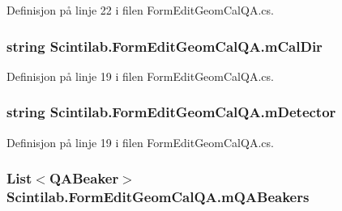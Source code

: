 Definisjon på linje 22 i filen Form\+Edit\+Geom\+Cal\+Q\+A.\+cs.

\hypertarget{class_scintilab_1_1_form_edit_geom_cal_q_a_a3f8a6138f8dc3a87ff3301739f7aad0a}{
\subsubsection[{m\+Cal\+Dir}]{\setlength{\rightskip}{0pt plus 5cm}string Scintilab.\+Form\+Edit\+Geom\+Cal\+Q\+A.\+m\+Cal\+Dir\hspace{0.3cm}{\ttfamily [private]}}}\label{class_scintilab_1_1_form_edit_geom_cal_q_a_a3f8a6138f8dc3a87ff3301739f7aad0a}


Definisjon på linje 19 i filen Form\+Edit\+Geom\+Cal\+Q\+A.\+cs.

\hypertarget{class_scintilab_1_1_form_edit_geom_cal_q_a_afadb7ab76847266dd9281e95ac5d3ce4}{
\subsubsection[{m\+Detector}]{\setlength{\rightskip}{0pt plus 5cm}string Scintilab.\+Form\+Edit\+Geom\+Cal\+Q\+A.\+m\+Detector\hspace{0.3cm}{\ttfamily [private]}}}\label{class_scintilab_1_1_form_edit_geom_cal_q_a_afadb7ab76847266dd9281e95ac5d3ce4}


Definisjon på linje 19 i filen Form\+Edit\+Geom\+Cal\+Q\+A.\+cs.

\hypertarget{class_scintilab_1_1_form_edit_geom_cal_q_a_a8465be0742cd30958c2575a537f28ba2}{
\subsubsection[{m\+Q\+A\+Beakers}]{\setlength{\rightskip}{0pt plus 5cm}List$<${\bf Q\+A\+Beaker}$>$ Scintilab.\+Form\+Edit\+Geom\+Cal\+Q\+A.\+m\+Q\+A\+Beakers\hspace{0.3cm}{\ttfamily [private]}}}\label{class_scintilab_1_1_form_edit_geom_cal_q_a_a8465be0742cd30958c2575a537f28ba2}


